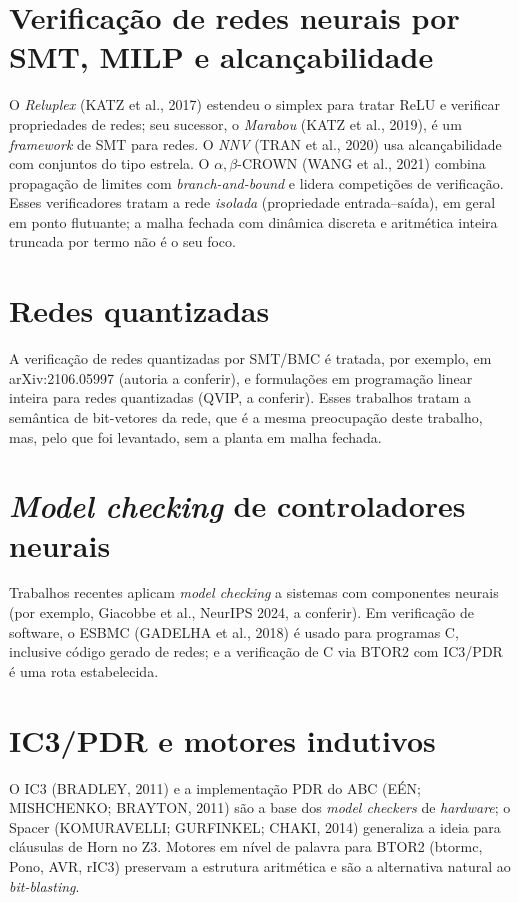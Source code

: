 \documentclass[12pt,openright,oneside,a4paper,chapter=TITLE,sumario=tradicional,english,brazil]{abntex2}
\begin{document}
\section{Verificação de redes neurais por SMT, MILP e alcançabilidade}

O \emph{Reluplex} (KATZ et al., 2017) estendeu o simplex para tratar ReLU e verificar propriedades de redes; seu sucessor, o \emph{Marabou} (KATZ et al., 2019), é um \emph{framework} de SMT para redes. O \emph{NNV} (TRAN et al., 2020) usa alcançabilidade com conjuntos do tipo estrela. O $\alpha,\beta$-CROWN (WANG et al., 2021) combina propagação de limites com \emph{branch-and-bound} e lidera competições de verificação. Esses verificadores tratam a rede \emph{isolada} (propriedade entrada--saída), em geral em ponto flutuante; a malha fechada com dinâmica discreta e aritmética inteira truncada por termo não é o seu foco.

\section{Redes quantizadas}

A verificação de redes quantizadas por SMT/BMC é tratada, por exemplo, em arXiv:2106.05997 (autoria a conferir), e formulações em programação linear inteira para redes quantizadas (QVIP, a conferir). Esses trabalhos tratam a semântica de bit-vetores da rede, que é a mesma preocupação deste trabalho, mas, pelo que foi levantado, sem a planta em malha fechada.

\section{\emph{Model checking} de controladores neurais}

Trabalhos recentes aplicam \emph{model checking} a sistemas com componentes neurais (por exemplo, Giacobbe et al., NeurIPS 2024, a conferir). Em verificação de software, o ESBMC (GADELHA et al., 2018) é usado para programas C, inclusive código gerado de redes; e a verificação de C via BTOR2 com IC3/PDR é uma rota estabelecida.

\section{IC3/PDR e motores indutivos}

O IC3 (BRADLEY, 2011) e a implementação PDR do ABC (EÉN; MISHCHENKO; BRAYTON, 2011) são a base dos \emph{model checkers} de \emph{hardware}; o Spacer (KOMURAVELLI; GURFINKEL; CHAKI, 2014) generaliza a ideia para cláusulas de Horn no Z3. Motores em nível de palavra para BTOR2 (btormc, Pono, AVR, rIC3) preservam a estrutura aritmética e são a alternativa natural ao \emph{bit-blasting}.
\end{document}
